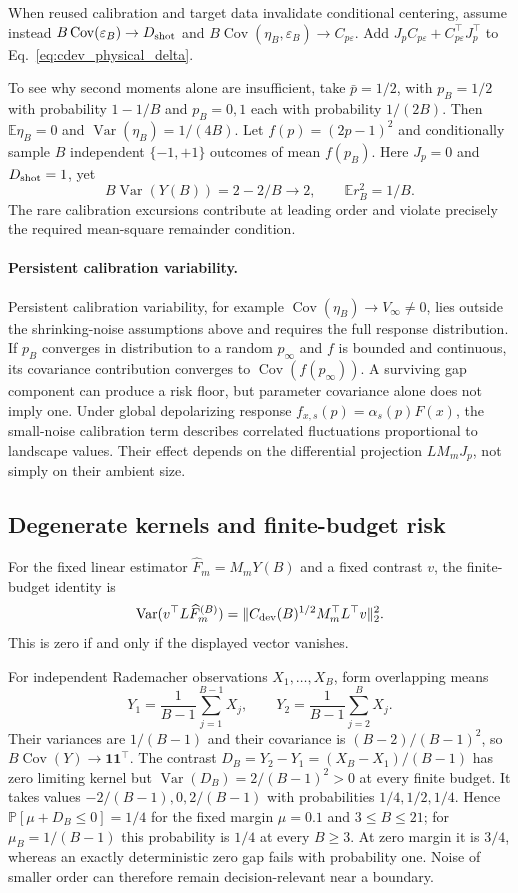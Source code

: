 \documentclass[a4paper,onecolumn,unpublished,nopdfoutputerror]{quantumarticle}
\theoremstyle{plain}
\theoremstyle{definition}
\newcommand{\E}{\mathbb{E}}
\newcommand{\Prob}{\mathbb{P}}
\newcommand{\Var}{\operatorname{Var}}
\newcommand{\Cov}{\operatorname{Cov}}
\newcommand{\1}{\mathbf{1}}
\begin{document}
When reused calibration and target data invalidate conditional centering, assume instead $B\Cov(\varepsilon_B)\to D_{\rm shot}$ and $B\Cov(\eta_B,\varepsilon_B)\to C_{p\varepsilon}$. Add $J_pC_{p\varepsilon}+C_{p\varepsilon}^\top J_p^\top$ to Eq.~\eqref{eq:cdev_physical_delta}.

To see why second moments alone are insufficient, take $\bar p=1/2$, with $p_B=1/2$ with probability $1-1/B$ and $p_B=0,1$ each with probability $1/(2B)$. Then $\E\eta_B=0$ and $\Var(\eta_B)=1/(4B)$. Let $f(p)=(2p-1)^2$ and conditionally sample $B$ independent $\{-1,+1\}$ outcomes of mean $f(p_B)$. Here $J_p=0$ and $D_{\rm shot}=1$, yet
\[
B\Var(Y(B))=2-2/B\longrightarrow2,
\qquad \E r_B^2=1/B.
\]
The rare calibration excursions contribute at leading order and violate precisely the required mean-square remainder condition.

\paragraph{Persistent calibration variability.}
Persistent calibration variability, for example $\Cov(\eta_B)\to V_\infty\ne0$, lies outside the shrinking-noise assumptions above and requires the full response distribution. If $p_B$ converges in distribution to a random $p_\infty$ and $f$ is bounded and continuous, its covariance contribution converges to $\Cov(f(p_\infty))$. A surviving gap component can produce a risk floor, but parameter covariance alone does not imply one. Under global depolarizing response $f_{x,s}(p)=\alpha_s(p)F(x)$, the small-noise calibration term describes correlated fluctuations proportional to landscape values. Their effect depends on the differential projection $LM_mJ_p$, not simply on their ambient size.

\subsection{Degenerate kernels and finite-budget risk}
\label{app:finite_budget_degeneracy}
For the fixed linear estimator $\widehat F_m=M_mY(B)$ and a fixed contrast $v$, the finite-budget identity is
\[
\Var(v^\top L\widehat F_m^{(B)})
=\|C_{\rm dev}(B)^{1/2}M_m^\top L^\top v\|_2^2.
\]
This is zero if and only if the displayed vector vanishes.

For independent Rademacher observations $X_1,\ldots,X_B$, form overlapping means
\[
Y_1=\frac1{B-1}\sum_{j=1}^{B-1}X_j,
\qquad Y_2=\frac1{B-1}\sum_{j=2}^{B}X_j.
\]
Their variances are $1/(B-1)$ and their covariance is $(B-2)/(B-1)^2$, so $B\Cov(Y)\to\1\1^\top$. The contrast $D_B=Y_2-Y_1=(X_B-X_1)/(B-1)$ has zero limiting kernel but $\Var(D_B)=2/(B-1)^2>0$ at every finite budget. It takes values $-2/(B-1),0,2/(B-1)$ with probabilities $1/4,1/2,1/4$. Hence $\Prob[\mu+D_B\le0]=1/4$ for the fixed margin $\mu=0.1$ and $3\le B\le21$; for $\mu_B=1/(B-1)$ this probability is $1/4$ at every $B\ge3$. At zero margin it is $3/4$, whereas an exactly deterministic zero gap fails with probability one. Noise of smaller order can therefore remain decision-relevant near a boundary.
\end{document}
